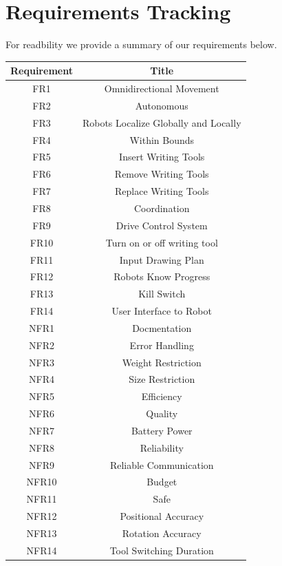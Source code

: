 \section{Requirements Tracking}
\label{sec:requirements_tracking}

For readbility we provide a summary of our requirements below. 

\begin{center}
 \begin{tabular}{||c c ||}
 \hline
 Requirement & Title \\ [0.5ex]
 \hline\hline
 FR1 & Omnidirectional Movement  \\
 \hline
 FR2 & Autonomous \\
 \hline
 FR3 & Robots Localize Globally and Locally \\
 \hline
 FR4 & Within Bounds \\
 \hline
 FR5 & Insert Writing Tools \\
 \hline
 FR6 & Remove Writing Tools \\
 \hline
 FR7 & Replace Writing Tools \\
 \hline
 FR8 & Coordination \\
 \hline
 FR9 & Drive Control System \\
 \hline
 FR10 & Turn on or off writing tool \\
 \hline
 FR11 & Input Drawing Plan \\
 \hline
 FR12 & Robots Know Progress \\
 \hline
 FR13 & Kill Switch \\
 \hline
 FR14 & User Interface to Robot \\
 \hline
 NFR1 & Docmentation \\
 \hline
 NFR2 & Error Handling \\
 \hline
 NFR3 & Weight Restriction \\
 \hline
 NFR4 & Size Restriction \\
 \hline
 NFR5 & Efficiency \\
 \hline
 NFR6 & Quality \\
 \hline
 NFR7 & Battery Power \\
 \hline 
 NFR8 & Reliability \\
 \hline 
 NFR9 & Reliable Communication \\
 \hline 
 NFR10 & Budget \\
 \hline 
 NFR11 & Safe \\
 \hline
 NFR12 & Positional Accuracy \\
 \hline
 NFR13 & Rotation Accuracy \\
 \hline
 NFR14 & Tool Switching Duration \\
\hline
\end{tabular}
\end{center}

